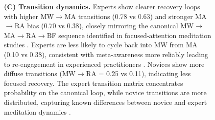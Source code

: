 \documentclass[openacc]{rsproca_new}%
\begin{document}
\begin{figure}[t!]
{\textbf{(C) Transition dynamics.}
Experts show clearer recovery loops with higher MW$\rightarrow$MA transitions (0.78 vs 0.63) and stronger MA$\rightarrow$RA bias (0.70 vs 0.38), closely mirroring the canonical MW$\rightarrow$MA$\rightarrow$RA$\rightarrow$BF sequence identified in focused-attention meditation studies \cite{Hasenkamp2012,Lutz2008}.
Experts are less likely to cycle back into MW from MA (0.10 vs 0.38), consistent with meta-awareness more reliably leading to re-engagement in experienced practitioners \cite{Schooler2011,Fox2015}.
Novices show more diffuse transitions (MW$\rightarrow$RA = 0.25 vs 0.11), indicating less focused recovery.
The expert transition matrix concentrates probability on the canonical loop, while novice transitions are more distributed, capturing known differences between novice and expert meditation dynamics \cite{Dahl2015,Escrichs2019}.}
\label{fig_2}
\end{figure}
\end{document}
